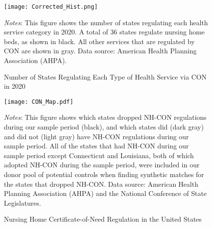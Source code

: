 \documentclass[../Main.tex]{subfiles}
\begin{document}
\newpage
\begin{figure}[t]
	\begin{center}
	\caption{\label{fig:nh_histogram} \centering Number of States Regulating Each Type of Health Service via CON in 2020}
    \texttt{[image: Corrected\_Hist.png]}
    \end{center}
    \footnotesize
		\textit{Notes}: This figure shows the number of states regulating each health service category in 2020. A total of 36 states regulate nursing home beds, as shown in black. All other services that are regulated by CON are shown in gray. Data source: American Health Planning Association (AHPA).
\end{figure}
\clearpage

\newpage
\begin{figure}[t]
	\begin{center}
	\caption{\label{fig:nh_con_map} \centering Nursing Home Certificate-of-Need Regulation in the United States}
    \texttt{[image: CON\_Map.pdf]}
    \end{center}
    \footnotesize
		\textit{Notes}: This figure shows which states dropped NH-CON regulations during our sample period (black), and which states did (dark gray) and did not (light gray) have NH-CON regulations during our sample period. All of the states that had NH-CON during our sample period except Connecticut and Louisiana, both of which adopted NH-CON during the sample period, were included in our donor pool of potential controls when finding synthetic matches for the states that dropped NH-CON. Data source: American Health Planning Association (AHPA) and the National Conference of State Legislatures.
\end{figure}
\clearpage
\end{document}
